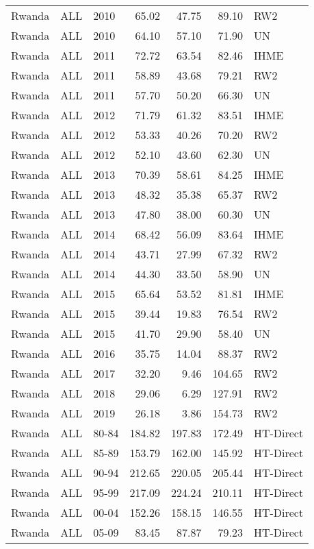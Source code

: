 \begin{longtable}{lllrrrl}
  Rwanda & ALL & 2010 & 65.02 & 47.75 & 89.10 & RW2 \\ 
  Rwanda & ALL & 2010 & 64.10 & 57.10 & 71.90 & UN \\ 
  Rwanda & ALL & 2011 & 72.72 & 63.54 & 82.46 & IHME \\ 
  Rwanda & ALL & 2011 & 58.89 & 43.68 & 79.21 & RW2 \\ 
  Rwanda & ALL & 2011 & 57.70 & 50.20 & 66.30 & UN \\ 
  Rwanda & ALL & 2012 & 71.79 & 61.32 & 83.51 & IHME \\ 
  Rwanda & ALL & 2012 & 53.33 & 40.26 & 70.20 & RW2 \\ 
  Rwanda & ALL & 2012 & 52.10 & 43.60 & 62.30 & UN \\ 
  Rwanda & ALL & 2013 & 70.39 & 58.61 & 84.25 & IHME \\ 
  Rwanda & ALL & 2013 & 48.32 & 35.38 & 65.37 & RW2 \\ 
  Rwanda & ALL & 2013 & 47.80 & 38.00 & 60.30 & UN \\ 
  Rwanda & ALL & 2014 & 68.42 & 56.09 & 83.64 & IHME \\ 
  Rwanda & ALL & 2014 & 43.71 & 27.99 & 67.32 & RW2 \\ 
  Rwanda & ALL & 2014 & 44.30 & 33.50 & 58.90 & UN \\ 
  Rwanda & ALL & 2015 & 65.64 & 53.52 & 81.81 & IHME \\ 
  Rwanda & ALL & 2015 & 39.44 & 19.83 & 76.54 & RW2 \\ 
  Rwanda & ALL & 2015 & 41.70 & 29.90 & 58.40 & UN \\ 
  Rwanda & ALL & 2016 & 35.75 & 14.04 & 88.37 & RW2 \\ 
  Rwanda & ALL & 2017 & 32.20 & 9.46 & 104.65 & RW2 \\ 
  Rwanda & ALL & 2018 & 29.06 & 6.29 & 127.91 & RW2 \\ 
  Rwanda & ALL & 2019 & 26.18 & 3.86 & 154.73 & RW2 \\ 
  Rwanda & ALL & 80-84 & 184.82 & 197.83 & 172.49 & HT-Direct \\ 
  Rwanda & ALL & 85-89 & 153.79 & 162.00 & 145.92 & HT-Direct \\ 
  Rwanda & ALL & 90-94 & 212.65 & 220.05 & 205.44 & HT-Direct \\ 
  Rwanda & ALL & 95-99 & 217.09 & 224.24 & 210.11 & HT-Direct \\ 
  Rwanda & ALL & 00-04 & 152.26 & 158.15 & 146.55 & HT-Direct \\ 
  Rwanda & ALL & 05-09 & 83.45 & 87.87 & 79.23 & HT-Direct \\ 

\end{longtable}
